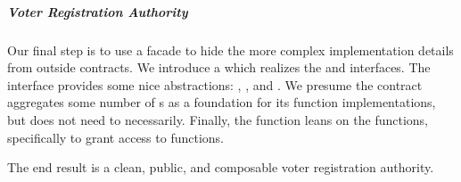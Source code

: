 \subparagraph{Voter Registration Authority}
Our final step is to use a facade to hide the more complex implementation
details from outside contracts. We introduce a 
which realizes the  and  interfaces.
The  interface provides some nice abstractions:
, , and . We
presume the contract aggregates some number of s as
a foundation for its  function implementations, but does not
need to necessarily. Finally, the  function leans on the
 functions, specifically  to grant
access to functions.

The end result is a clean, public, and composable voter registration authority.
